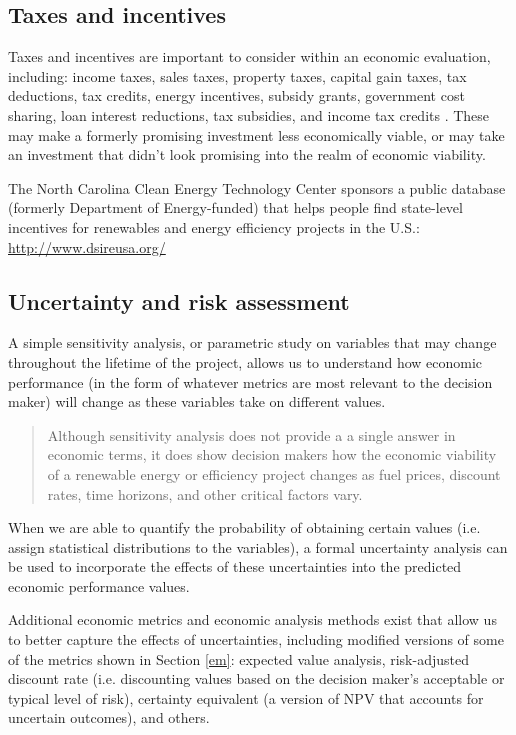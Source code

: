 \documentclass[10pt]{article}
\begin{document}
\subsection{Taxes and incentives}

Taxes and incentives are important to consider within an economic evaluation, including: income taxes, sales taxes, property taxes, capital gain taxes, tax deductions, tax credits, energy incentives, subsidy grants, government cost sharing, loan interest reductions, tax subsidies, and income tax credits \cite{Goswami2007-hf}. These may make a formerly promising investment less economically viable, or may take an investment that didn't look promising into the realm of economic viability.

The North Carolina Clean Energy Technology Center sponsors a public database (formerly Department of Energy-funded) that helps people find state-level incentives for renewables and energy efficiency projects in the U.S.: \url{http://www.dsireusa.org/}

\subsection{Uncertainty and risk assessment}

A simple sensitivity analysis, or parametric study on variables that may change throughout the lifetime of the project, allows us to understand how economic performance (in the form of whatever metrics are most relevant to the decision maker) will change as these variables take on different values.

\begin{quote}
    Although sensitivity analysis does not provide a a single answer in economic terms, it does show decision makers how the economic viability of a renewable energy or efficiency project changes as fuel prices, discount rates, time horizons, and other critical factors vary. \cite{Goswami2007-hf}
\end{quote}

When we are able to quantify the probability of obtaining certain values (i.e. assign statistical distributions to the variables), a formal uncertainty analysis can be used to incorporate the effects of these uncertainties into the predicted economic performance values.

Additional economic metrics and economic analysis methods exist that allow us to better capture the effects of uncertainties, including modified versions of some of the metrics shown in Section \ref{em}: expected value analysis, risk-adjusted discount rate (i.e. discounting values based on the decision maker's acceptable or typical level of risk), certainty equivalent (a version of NPV that accounts for uncertain outcomes), and others.
\end{document}
